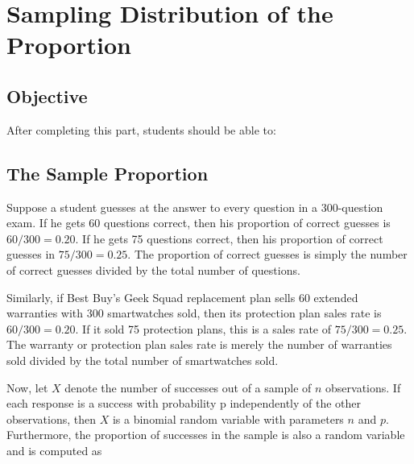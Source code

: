\documentclass[11pt]{book}\usepackage[]{graphicx}\usepackage[]{color}
\begin{document}
\begin{exercises}
\begin{exercise}
\end{exercise}
\begin{solution}   %


\end{solution}

\end{exercises}
 
\onecolumn




\chapter{Sampling Distribution of the Proportion}
\label{chap:ch8}

\section{Objective}

After completing this part, students should be able to:


\section{The Sample Proportion}

Suppose a student guesses at the answer to every question in a 300-question exam.  If he gets 60 questions correct, then his proportion of correct guesses is $60/300 = 0.20$.  If he gets 75 questions correct, then his proportion of correct guesses in $75/300 = 0.25$.  The proportion of correct guesses is simply the number of correct guesses divided by the total number of questions.

Similarly, if Best Buy's Geek Squad replacement plan sells 60 extended warranties with 300 smartwatches sold, then its protection plan sales rate is $60/300 = 0.20$. If it sold 75 protection plans, this is a sales rate of $75/300 = 0.25$.  The warranty or protection plan sales rate is merely the number of warranties sold divided by the total number of smartwatches sold.

Now, let $X$ denote the number of successes out of a sample of $n$ observations. If each response is a success with probability p independently of the other observations, then $X$ is a binomial random variable with parameters $n$ and $p$.  Furthermore, the proportion of successes in the sample is also a random variable and is computed as
\end{document}
